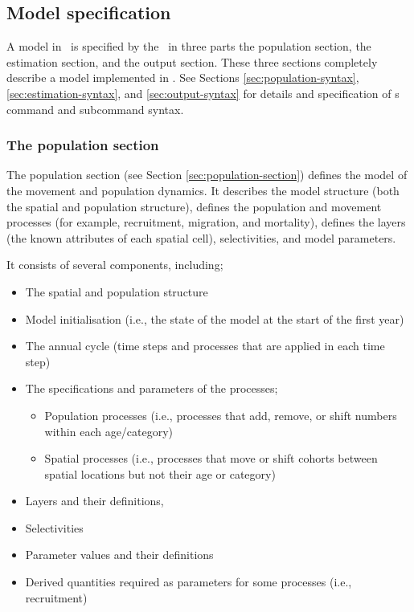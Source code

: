 \subsection{Model specification}

A model in \SPM\ is specified by the \config\ in three parts \textemdash the population section, the estimation section, and the output section. These three sections completely describe a model implemented in \SPM. See Sections \ref{sec:population-syntax}, \ref{sec:estimation-syntax}, and \ref{sec:output-syntax} for details and specification of \SPM s command and subcommand syntax. 

\subsubsection{The population section}

The population section (see Section \ref{sec:population-section}) defines the model of the movement and population dynamics. It describes the model structure (both the spatial and population structure), defines the population and movement processes (for example, recruitment, migration, and mortality), defines the layers (the known attributes of each spatial cell), selectivities, and model parameters.

It consists of several components, including;
\begin{itemize}
  \item The spatial and population structure
  \item Model initialisation (i.e., the state of the model at the start of the first year)
  \item The annual cycle (time steps and processes that are applied in each time step)
  \item The specifications and parameters of the processes;
  \begin{itemize}
    \item Population processes (i.e., processes that add, remove, or shift numbers within each age/category)
    \item Spatial processes (i.e., processes that move or shift cohorts between spatial locations but not their age or category)
  \end{itemize}
  \item Layers and their definitions,
  \item Selectivities
  \item Parameter values and their definitions
  \item Derived quantities required as parameters for some processes (i.e., recruitment)
\end{itemize}

